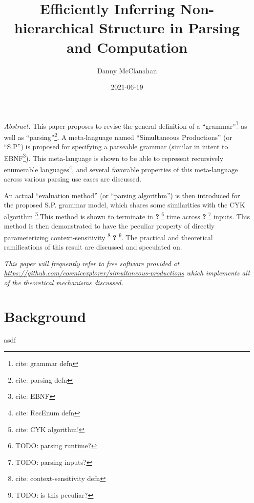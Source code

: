 \documentclass[10pt]{article}
\title{Efficiently Inferring Non-hierarchical Structure in Parsing and Computation}
\date{2021-06-19}
\author{Danny McClanahan}
\newcommand{\todocite}[1]{\footnote{cite: #1}}
\newcommand{\todo}[1]{\textbf{?} \footnote{TODO: #1}}
\begin{document}
\maketitle

\textit{Abstract:} This paper proposes to revise the general definition of a ``grammar''\todocite{grammar defn} as well as ``parsing''\todocite{parsing defn}. A meta-language named ``Simultaneous Productions'' (or ``S.P'') is proposed for specifying a parseable grammar (similar in intent to EBNF\todocite{EBNF}). This meta-language is shown to be able to represent recursively enumerable languages\todocite{RecEnum defn}, and several favorable properties of this meta-language across various parsing use cases are discussed.

An actual ``evaluation method'' (or ``parsing algorithm'') is then introduced for the proposed S.P. grammar model, which shares some similarities with the CYK algorithm \todocite{CYK algorithm!}.This method is shown to terminate in \todo{parsing runtime?} time across \todo{parsing inputs?} inputs. This method is then demonstrated to have the peculiar property of directly parameterizing context-sensitivity \todocite{context-sensitivity defn} \todo{is this peculiar?}. The practical and theoretical ramifications of this result are discussed and speculated on.

\textit{This paper will frequently refer to free software provided at \url{https://github.com/cosmicexplorer/simultaneous-productions} which implements all of the theoretical mechanisms discussed.}

\tableofcontents

\section{Background}
\label{sec:background}

asdf
\end{document}
